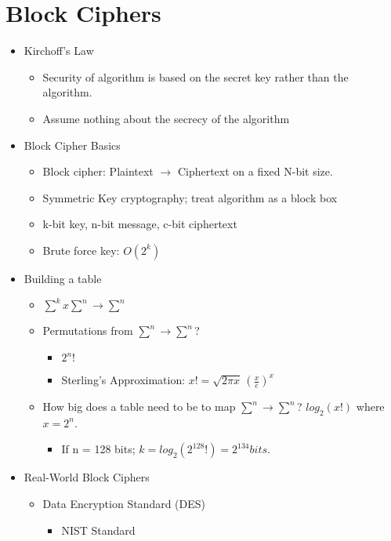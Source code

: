 \section{Block Ciphers}
\begin{itemize}
\item Kirchoff's Law
    \begin{itemize}
    \item Security of algorithm is based on the secret key rather than the algorithm.
    \item Assume nothing about the secrecy of the algorithm
    \end{itemize}
\item Block Cipher Basics
    \begin{itemize}
    \item Block cipher: Plaintext $\rightarrow$ Ciphertext on a fixed N-bit size. 
    \item Symmetric Key cryptography; treat algorithm as a block box
    \item k-bit key, n-bit message, c-bit ciphertext
    \item Brute force key: $O(2^k)$
    \end{itemize}
\item Building a table
    \begin{itemize}
    \item $\sum^k x \sum^n \rightarrow \sum^n$
    \item Permutations from $\sum^n \rightarrow \sum^n$?
        \begin{itemize}
        \item $2^n!$
        \item Sterling's Approximation: $x! = \sqrt{2\pi x}\,(\frac{x}{e})^x $
        \end{itemize}
    \item How big does a table need to be to map $\sum^n \rightarrow \sum^n$? $log_2(x!)$ where $x = 2^n$.
        \begin{itemize}
        \item If n = 128 bits; $k = log_2(2^{128}!) = 2^{134} bits.$
        \end{itemize}
    \end{itemize}
\item Real-World Block Ciphers
\begin{itemize}
    \item Data Encryption Standard (DES)
        \begin{itemize}
        \item NIST Standard

\end{itemize}
\end{itemize}
\end{itemize}
